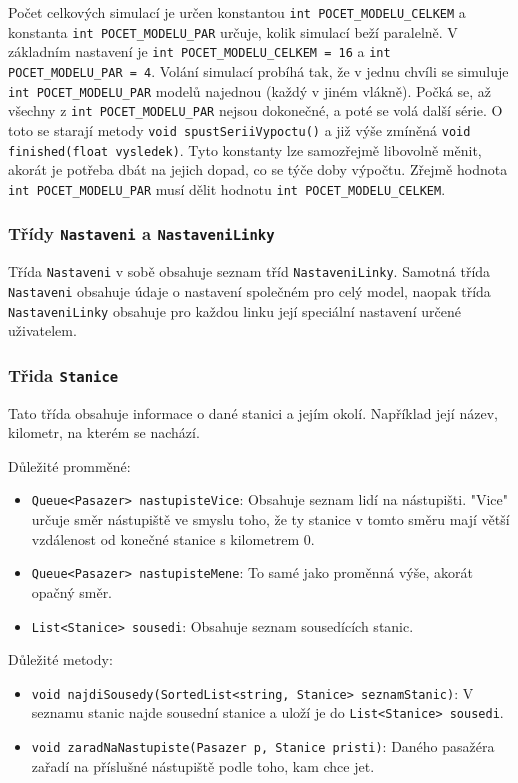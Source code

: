 \documentclass[12pt, a4paper]{article}
\begin{document}
Počet celkových simulací je určen konstantou \texttt{int POCET\_MODELU\_CELKEM} a konstanta \texttt{int POCET\_MODELU\_PAR} určuje, kolik simulací beží paralelně. V základním nastavení je  \texttt{int POCET\_MODELU\_CELKEM = 16} a \texttt{int POCET\_MODELU\_PAR = 4}. Volání simulací probíhá tak, že v jednu chvíli se simuluje \texttt{int POCET\_MODELU\_PAR} modelů najednou (každý v jiném vlákně). Počká se, až všechny z \texttt{int POCET\_MODELU\_PAR} nejsou dokonečné, a poté se volá další série. O toto se starají metody \texttt{void spustSeriiVypoctu()} a již výše zmíněná \texttt{void finished(float vysledek)}. Tyto konstanty lze samozřejmě libovolně měnit, akorát je potřeba dbát na jejich dopad, co se týče doby výpočtu. Zřejmě hodnota \texttt{int POCET\_MODELU\_PAR} musí dělit hodnotu \texttt{int POCET\_MODELU\_CELKEM}.

\subsubsection{Třídy \texttt{Nastaveni} a \texttt{NastaveniLinky}}
Třída \texttt{Nastaveni} v sobě obsahuje seznam tříd \texttt{NastaveniLinky}. Samotná třída \texttt{Nastaveni} obsahuje údaje o nastavení společném pro celý model, naopak třída \texttt{NastaveniLinky} obsahuje pro každou linku její speciální nastavení určené uživatelem.

\subsubsection{Třida \texttt{Stanice}}
Tato třída obsahuje informace o dané stanici a jejím okolí. Například její název, kilometr, na kterém se nachází.

Důležité promměné:
\begin{itemize}
    \item{\texttt{Queue<Pasazer> nastupisteVice}}: Obsahuje seznam lidí na nástupišti. "Vice" určuje směr nástupiště ve smyslu toho, že ty stanice v tomto směru mají větší vzdálenost od konečné stanice s kilometrem 0.
    \item{\texttt{Queue<Pasazer> nastupisteMene}}: To samé jako proměnná výše, akorát opačný směr.
    \item{\texttt{List<Stanice> sousedi}}: Obsahuje seznam sousedících stanic.
\end{itemize}

Důležité metody:
\begin{itemize}
    \item{\texttt{void najdiSousedy(SortedList<string, Stanice> seznamStanic)}}: V seznamu stanic najde sousední stanice a uloží je do \texttt{List<Stanice> sousedi}.
    \item{\texttt{void zaradNaNastupiste(Pasazer p, Stanice pristi)}}: Daného pasažéra zařadí na příslušné nástupiště podle toho, kam chce jet.
\end{itemize}
\end{document}
